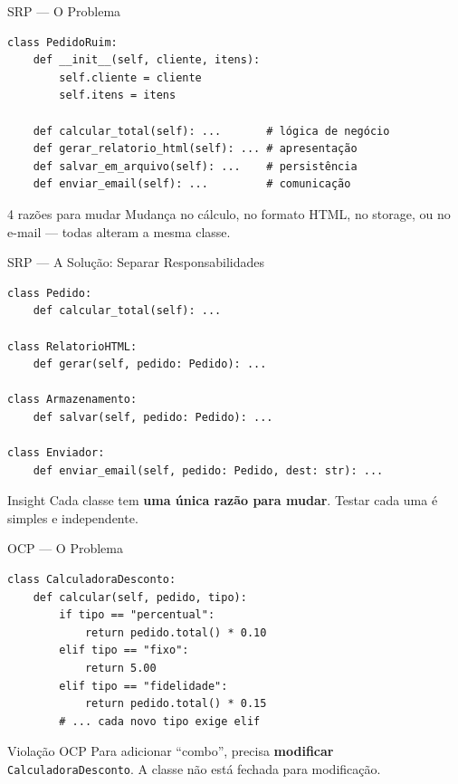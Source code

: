 \documentclass[aspectratio=169]{beamer}
\begin{document}
\begin{frame}[fragile]{SRP --- O Problema}
\begin{lstlisting}
class PedidoRuim:
    def __init__(self, cliente, itens):
        self.cliente = cliente
        self.itens = itens

    def calcular_total(self): ...       # lógica de negócio
    def gerar_relatorio_html(self): ... # apresentação
    def salvar_em_arquivo(self): ...    # persistência
    def enviar_email(self): ...         # comunicação
\end{lstlisting}

\begin{alertblock}{4 razões para mudar}
Mudança no cálculo, no formato HTML, no storage, ou no e-mail --- todas alteram a mesma classe.
\end{alertblock}
\end{frame}

\begin{frame}[fragile]{SRP --- A Solução: Separar Responsabilidades}
\begin{lstlisting}
class Pedido:
    def calcular_total(self): ...

class RelatorioHTML:
    def gerar(self, pedido: Pedido): ...

class Armazenamento:
    def salvar(self, pedido: Pedido): ...

class Enviador:
    def enviar_email(self, pedido: Pedido, dest: str): ...
\end{lstlisting}

\begin{exampleblock}{Insight}
Cada classe tem \textbf{uma única razão para mudar}. Testar cada uma é simples e independente.
\end{exampleblock}
\end{frame}

\begin{frame}[fragile]{OCP --- O Problema}
\begin{lstlisting}
class CalculadoraDesconto:
    def calcular(self, pedido, tipo):
        if tipo == "percentual":
            return pedido.total() * 0.10
        elif tipo == "fixo":
            return 5.00
        elif tipo == "fidelidade":
            return pedido.total() * 0.15
        # ... cada novo tipo exige elif
\end{lstlisting}

\begin{alertblock}{Violação OCP}
Para adicionar ``combo'', precisa \textbf{modificar} \texttt{CalculadoraDesconto}. A classe não está fechada para modificação.
\end{alertblock}
\end{frame}
\end{document}
